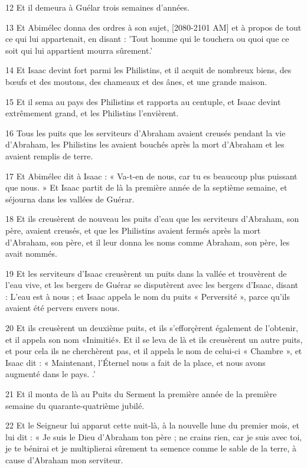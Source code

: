 \par 12 Et il demeura à Guélar trois semaines d'années.
\par 13 Et Abimélec donna des ordres à son sujet, [2080-2101 AM] et à propos de tout ce qui lui appartenait, en disant : 'Tout homme qui le touchera ou quoi que ce soit qui lui appartient mourra sûrement.'
\par 14 Et Isaac devint fort parmi les Philistins, et il acquit de nombreux biens, des bœufs et des moutons, des chameaux et des ânes, et une grande maison.
\par 15 Et il sema au pays des Philistins et rapporta au centuple, et Isaac devint extrêmement grand, et les Philistins l'envièrent.
\par 16 Tous les puits que les serviteurs d'Abraham avaient creusés pendant la vie d'Abraham, les Philistins les avaient bouchés après la mort d'Abraham et les avaient remplis de terre.
\par 17 Et Abimélec dit à Isaac : « Va-t-en de nous, car tu es beaucoup plus puissant que nous. » Et Isaac partit de là la première année de la septième semaine, et séjourna dans les vallées de Guérar.
\par 18 Et ils creusèrent de nouveau les puits d'eau que les serviteurs d'Abraham, son père, avaient creusés, et que les Philistins avaient fermés après la mort d'Abraham, son père, et il leur donna les noms comme Abraham, son père, les avait nommés.
\par 19 Et les serviteurs d'Isaac creusèrent un puits dans la vallée et trouvèrent de l'eau vive, et les bergers de Guérar se disputèrent avec les bergers d'Isaac, disant : L'eau est à nous ; et Isaac appela le nom du puits « Perversité », parce qu'ils avaient été pervers envers nous.
\par 20 Et ils creusèrent un deuxième puits, et ils s'efforçèrent également de l'obtenir, et il appela son nom «Inimitié». Et il se leva de là et ils creusèrent un autre puits, et pour cela ils ne cherchèrent pas, et il appela le nom de celui-ci « Chambre », et Isaac dit : « Maintenant, l'Éternel nous a fait de la place, et nous avons augmenté dans le pays. .'
\par 21 Et il monta de là au Puits du Serment la première année de la première semaine du quarante-quatrième jubilé.
\par 22 Et le Seigneur lui apparut cette nuit-là, à la nouvelle lune du premier mois, et lui dit : « Je suis le Dieu d'Abraham ton père ; ne crains rien, car je suis avec toi, je te bénirai et je multiplierai sûrement ta semence comme le sable de la terre, à cause d'Abraham mon serviteur.

